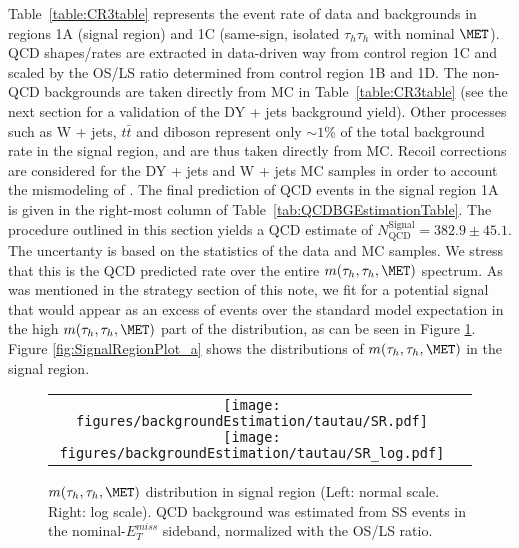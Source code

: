 Table~\ref{table:CR3table} represents the event rate of data and backgrounds in regions 1A (signal region) and 1C (same-sign, isolated $\tau_{h}\tau_{h}$ with nominal $\MET$). QCD 
shapes/rates are extracted in data-driven way from control region 1C and scaled by the OS/LS ratio determined from control region 1B and 1D. The non-QCD 
backgrounds are taken directly from MC in Table~\ref{table:CR3table} (see the next section for a validation of the DY + jets background yield). Other processes such as W + jets, 
$t\bar{t}$ and diboson represent only $\sim 1$\% of the total background rate in the signal region, and are thus taken directly from MC. Recoil corrections are considered for the DY + jets and W + jets MC samples in order to account the mismodeling of \MET. The final prediction of QCD events in the signal region 1A is given in the right-most column of Table~\ref{tab:QCDBGEstimationTable}. The procedure outlined in this section yields a QCD estimate of 
$N_{\textrm{QCD}}^{\textrm{Signal}} = 382.9 \pm 45.1 $. The uncertanty is based on the statistics of the data and MC samples. We stress that this is the QCD predicted rate over the entire $m(\tau_{h},\tau_{h},\MET)$ spectrum. As was mentioned in the strategy section of this note, we fit for a potential signal that would appear as an excess of events over the standard model expectation in the high $m(\tau_{h},\tau_{h},\MET)$ part of the distribution, as can be seen in Figure \ref{fig:BkgEstimation_SR}. Figure \ref{fig:SignalRegionPlot_a} shows the distributions of $m(\tau_{h},\tau_{h},\MET)$ in the signal region.

\begin{figure}[tbhp!]
      \centering
      \begin{tabular}{cc}
        
        \texttt{[image: figures/backgroundEstimation/tautau/SR.pdf]}
        \texttt{[image: figures/backgroundEstimation/tautau/SR\_log.pdf]}
      \end{tabular}
      \caption{$m(\tau_{h},\tau_{h},\MET)$ distribution in signal region (Left: normal scale. Right: log scale). QCD 
        background was estimated from SS events in the nominal-$E^{miss}_{T}$ sideband, normalized with the OS/LS ratio.}
    \label{fig:BkgEstimation_SR}
 \end{figure}

 


